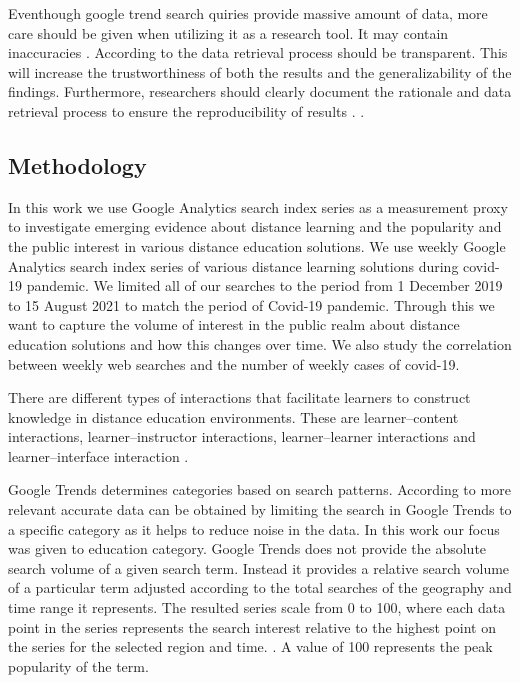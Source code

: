 \documentclass[11pt,a4paper,]{article}
\begin{document}
Eventhough google trend search quiries provide massive amount of data, more care should be given when utilizing it as a research tool. It may contain inaccuracies \autocite{carneiro2009google}. According to \textcite{nuti2014use} the data retrieval process should be transparent. This will increase the trustworthiness of both the results and the generalizability of the findings. Furthermore, researchers should clearly document the rationale and data retrieval process to ensure the reproducibility of results \autocite{nuti2014use}. .

\hypertarget{methodology}{%
\subsection{Methodology}\label{methodology}}

In this work we use Google Analytics search index series as a measurement proxy to investigate emerging evidence about distance learning and the popularity and the public interest in various distance education solutions. We use weekly Google Analytics search index series of various distance learning solutions during covid-19 pandemic. We limited all of our searches to the period from 1 December 2019 to 15 August 2021 to match the period of Covid-19 pandemic. Through this we want to capture the volume of interest in the public realm about distance education solutions and how this changes over time. We also study the correlation between weekly web searches and the number of weekly cases of covid-19.

There are different types of interactions that facilitate learners to construct knowledge in distance education environments. These are learner--content interactions, learner--instructor interactions, learner--learner interactions and learner--interface interaction \autocite{wallace2003online}.

Google Trends determines categories based on search patterns. According to \textcite{vaughan2014web} more relevant accurate data can be obtained by limiting the search in Google Trends to a specific category as it helps to reduce noise in the data. In this work our focus was given to education category. Google Trends does not provide the absolute search volume of a given search term. Instead it provides a relative search volume of a particular term adjusted according to the total searches of the geography and time range it represents. The resulted series scale from 0 to 100, where each data point in the series represents the search interest relative to the highest point on the series for the selected region and time. \autocite{alicino2015assessing,vaughan2014web}. A value of 100 represents the peak popularity of the term.
\end{document}
